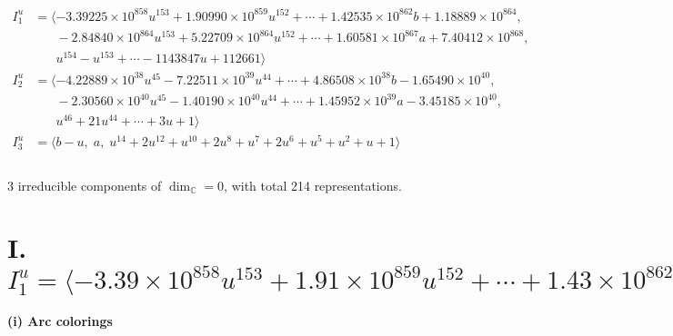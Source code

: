 \documentclass[1p]{elsarticle_modified}
\theoremstyle{definition}
\begin{document}
\begin{align*}
I^u_{1}&=\langle 
-3.39225\times10^{858} u^{153}+1.90990\times10^{859} u^{152}+\cdots+1.42535\times10^{862} b+1.18889\times10^{864},\\
\phantom{I^u_{1}}&\phantom{= \langle  }-2.84840\times10^{864} u^{153}+5.22709\times10^{864} u^{152}+\cdots+1.60581\times10^{867} a+7.40412\times10^{868},\\
\phantom{I^u_{1}}&\phantom{= \langle  }u^{154}- u^{153}+\cdots-1143847 u+112661\rangle \\
I^u_{2}&=\langle 
-4.22889\times10^{38} u^{45}-7.22511\times10^{39} u^{44}+\cdots+4.86508\times10^{38} b-1.65490\times10^{40},\\
\phantom{I^u_{2}}&\phantom{= \langle  }-2.30560\times10^{40} u^{45}-1.40190\times10^{40} u^{44}+\cdots+1.45952\times10^{39} a-3.45185\times10^{40},\\
\phantom{I^u_{2}}&\phantom{= \langle  }u^{46}+21 u^{44}+\cdots+3 u+1\rangle \\
I^u_{3}&=\langle 
b- u,\;a,\;u^{14}+2 u^{12}+u^{10}+2 u^8+u^7+2 u^6+u^5+u^2+u+1\rangle \\
\\
\end{align*}
\raggedright * 3 irreducible components of $\dim_{\mathbb{C}}=0$, with total 214 representations.\\
\newpage
\renewcommand{\arraystretch}{1}
\centering \section*{I. $I^u_{1}= \langle -3.39\times10^{858} u^{153}+1.91\times10^{859} u^{152}+\cdots+1.43\times10^{862} b+1.19\times10^{864},\;-2.85\times10^{864} u^{153}+5.23\times10^{864} u^{152}+\cdots+1.61\times10^{867} a+7.40\times10^{868},\;u^{154}- u^{153}+\cdots-1143847 u+112661 \rangle$}
\flushleft \textbf{(i) Arc colorings}\\
\end{document}

